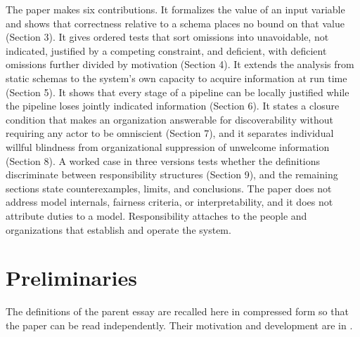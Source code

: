 \documentclass[11pt]{article}
\theoremstyle{plain}
\theoremstyle{definition}
\begin{document}
The paper makes six contributions. It formalizes the value of an input variable and shows that correctness relative to a schema places no bound on that value (Section 3). It gives ordered tests that sort omissions into unavoidable, not indicated, justified by a competing constraint, and deficient, with deficient omissions further divided by motivation (Section 4). It extends the analysis from static schemas to the system's own capacity to acquire information at run time (Section 5). It shows that every stage of a pipeline can be locally justified while the pipeline loses jointly indicated information (Section 6). It states a closure condition that makes an organization answerable for discoverability without requiring any actor to be omniscient (Section 7), and it separates individual willful blindness from organizational suppression of unwelcome information (Section 8). A worked case in three versions tests whether the definitions discriminate between responsibility structures (Section 9), and the remaining sections state counterexamples, limits, and conclusions. The paper does not address model internals, fairness criteria, or interpretability, and it does not attribute duties to a model. Responsibility attaches to the people and organizations that establish and operate the system.

\section{Preliminaries}

The definitions of the parent essay are recalled here in compressed form so that the paper can be read independently. Their motivation and development are in \cite{flyxion2026domain}.
\end{document}
